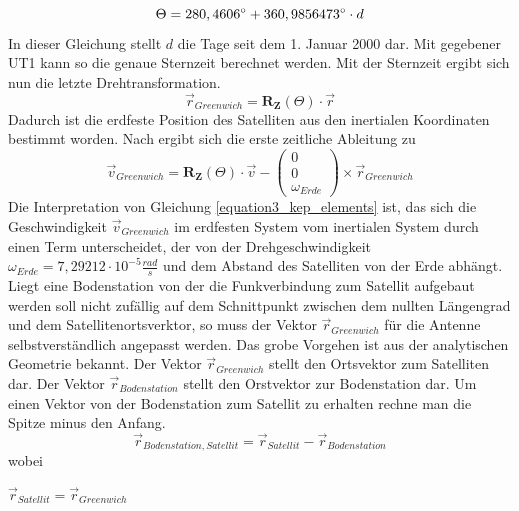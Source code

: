 \begin{equation}
	\Theta = 280,4606\degree+360,9856473\degree\cdot d
\end{equation} 
In dieser Gleichung stellt \ensuremath{d} die Tage seit dem 1. Januar 2000 dar. Mit gegebener UT1 kann so die genaue Sternzeit berechnet werden. Mit der Sternzeit ergibt sich nun die letzte Drehtransformation. 
\begin{equation}
	\vec{r}_{Greenwich}=\mathbf{R_Z}(\Theta) \cdot \vec{r}
\end{equation} 
Dadurch ist die erdfeste Position des Satelliten aus den inertialen Koordinaten bestimmt worden. Nach \cite{HandRaum} ergibt sich die erste zeitliche Ableitung zu
\begin{equation}
	\vec{v}_{Greenwich}=\mathbf{R_Z}(\Theta)\cdot\vec{v}-\left(\begin{array}{c}0\\0\\\omega_{Erde}\end{array}\right)\times\vec{r}_{Greenwich}
	\label{equation3_kep_elements}
\end{equation}   
Die Interpretation von Gleichung \ref{equation3_kep_elements} ist, das sich die Geschwindigkeit \ensuremath{\vec{v}_{Greenwich}} im erdfesten System vom inertialen System durch einen Term unterscheidet, der von der Drehgeschwindigkeit \ensuremath{\omega_{Erde}=7,29212\cdot 10^{-5}\frac{rad}{s}} und dem Abstand des Satelliten von der Erde abhängt. 
\newpar
Liegt eine Bodenstation von der die Funkverbindung zum Satellit aufgebaut werden soll nicht zufällig auf dem Schnittpunkt zwischen dem nullten Längengrad und dem Satellitenortsverktor, so muss der Vektor \ensuremath{\vec{r}_{Greenwich}} für die Antenne selbstverständlich angepasst werden. Das grobe Vorgehen ist aus der analytischen Geometrie bekannt. Der Vektor \ensuremath{\vec{r}_{Greenwich}} stellt den Ortsvektor zum Satelliten dar. Der Vektor \ensuremath{\vec{r}_{Bodenstation}} stellt den Orstvektor zur Bodenstation dar. Um einen Vektor von der Bodenstation zum Satellit zu erhalten rechne man die Spitze minus den Anfang.
\begin{equation}
	\vec{r}_{Bodenstation,Satellit}=\vec{r}_{Satellit}-\vec{r}_{Bodenstation}
\end{equation} 
wobei 
\begin{center}
	\begin{math}
		\vec{r}_{Satellit}=\vec{r}_{Greenwich}
	\end{math}
\end{center}
